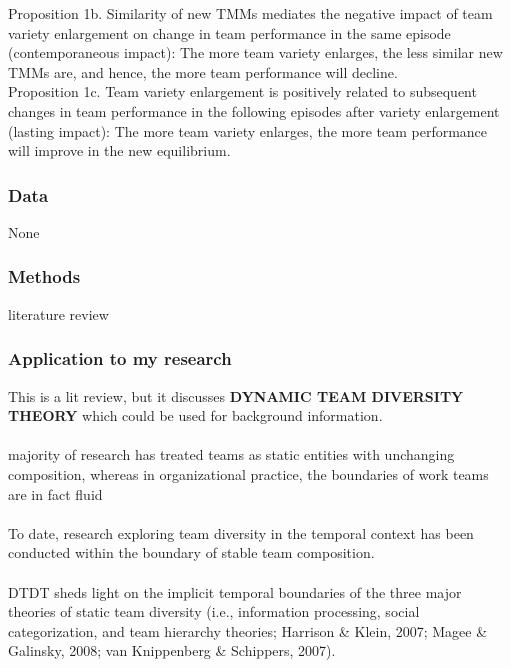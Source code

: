 \documentclass[12pt]{article}
\begin{document}
Proposition 1b. Similarity of new TMMs mediates the negative impact of team variety enlargement on change in team performance in the same episode (contemporaneous impact): The more team variety enlarges, the less similar new TMMs are, and hence, the more team performance will decline. \\

Proposition 1c. Team variety enlargement is positively related to subsequent changes in team performance in the following episodes after variety enlargement (lasting impact): The more team variety enlarges, the more team performance will improve in the new equilibrium.


\subsubsection*{Data}

None

\subsubsection*{Methods}

literature review

\subsubsection*{Application to my research}

This is a lit review, but it discusses \textbf{DYNAMIC TEAM DIVERSITY THEORY} which could be used for background information.\\\\

majority of research has treated teams as static entities with unchanging composition, whereas in organizational practice, the boundaries of work teams are in fact fluid\\\\

To date, research exploring team diversity in the temporal context has been conducted within the boundary of stable team composition.\\\\

DTDT sheds light on the implicit temporal boundaries of the three major theories of static team diversity (i.e., information processing, social categorization, and team hierarchy theories; Harrison \& Klein, 2007; Magee \& Galinsky, 2008; van Knippenberg \& Schippers, 2007).
\end{document}

